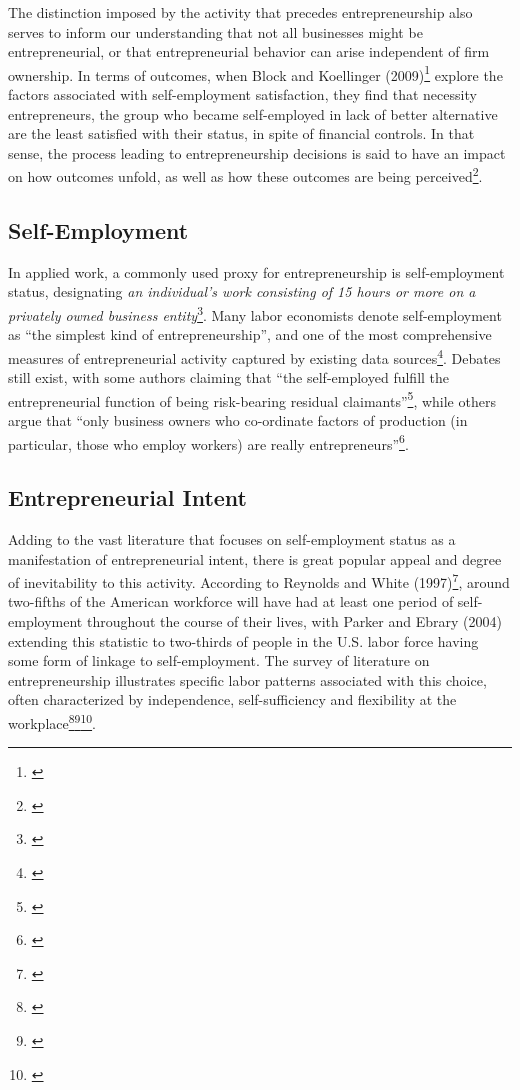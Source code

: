 The distinction imposed by the activity that precedes entrepreneurship also serves to inform our understanding that not all businesses might be entrepreneurial, or that entrepreneurial behavior can arise independent of firm ownership. In terms of outcomes, when Block and Koellinger (2009)\footnote{\cite{BlockKoellinger2009}} explore the factors associated with self-employment satisfaction, they find that necessity entrepreneurs, the group who became self-employed in lack of better alternative are the least satisfied with their status, in spite of financial controls. In that sense, the process leading to entrepreneurship decisions is said to have an impact on how outcomes unfold, as well as how these outcomes are being perceived\footnote{\cite{BlockKoellinger2009}}.

\subsection{Self-Employment}

In applied work, a commonly used proxy for entrepreneurship is self-employment status, designating \textit{an individual's work consisting of 15 hours or more on a privately owned business entity}\footnote{\cite{BlanchflowerOswald1998}}. Many labor economists denote self-employment as ``the simplest kind of entrepreneurship'', and one of the most comprehensive measures of entrepreneurial activity captured by existing data sources\footnote{\cite{Parker2004}}. Debates still exist, with some authors claiming that ``the self-employed fulfill the entrepreneurial function of being risk-bearing residual claimants''\footnote{\cite[Page 5]{Parker2004}}, while others argue that ``only business owners who co-ordinate factors of production (in particular, those who employ workers) are really entrepreneurs''\footnote{\cite[Page 5]{Parker2004}}.

\subsection{Entrepreneurial Intent}

Adding to the vast literature that focuses on self-employment status as a manifestation of entrepreneurial intent, there is great popular appeal and degree of inevitability to this activity. According to Reynolds and White (1997)\footnote{\cite{ReynoldsWhite1997}}, around two-fifths of the American workforce will have had at least one period of self-employment throughout the course of their lives, with Parker and Ebrary (2004) extending this statistic to two-thirds of people in the U.S. labor force having some form of linkage to self-employment. The survey of literature on entrepreneurship illustrates specific labor patterns associated with this choice, often characterized by independence, self-sufficiency and flexibility at the workplace\footnote{\cite{RodrguezFierroGarridoNavarro2015}}\hspace{.15em}\footnote{\cite{Parker2004}}\hspace{.15em}\footnote{\cite{Quinn1980}}. 

